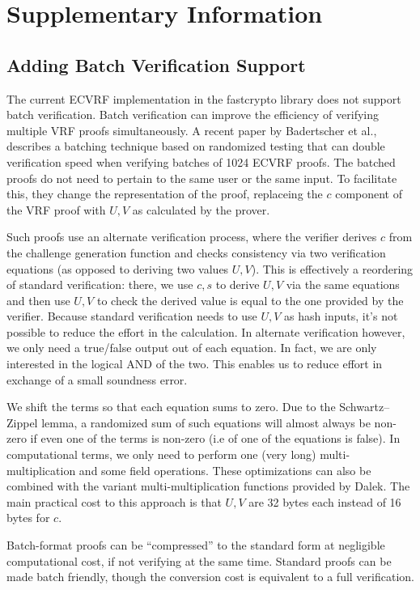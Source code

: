 \section{Supplementary Information}
\subsection{Adding Batch Verification Support}
The current ECVRF implementation in the fastcrypto library does not support batch verification. Batch verification can improve the efficiency of verifying multiple VRF proofs simultaneously. A recent paper by Badertscher et al.\cite{batch-ecvrf}, describes a batching technique based on randomized testing that can double verification speed when verifying batches of 1024 ECVRF proofs. The batched proofs do not need to pertain to the same user or the same input. To facilitate this, they change the representation of the proof, replaceing the $c$ component of the VRF proof with $U,V$ as calculated by the prover.


Such proofs use an alternate verification process, where the verifier derives $c$ from the challenge generation function and checks consistency via two verification equations (as opposed to deriving two values $U,V$). This is effectively a reordering of standard verification: there, we use $c,s$ to derive $U,V$ via the same equations and then use $U,V$ to check the derived value is equal to the one provided by the verifier. Because standard verification needs to use $U,V$ as hash inputs, it’s not possible to reduce the effort in the calculation. In alternate verification however, we only need a true/false output out of each equation. In fact, we are only interested in the logical AND of the two. This enables us to reduce effort in exchange of a small soundness error.   

We shift the terms so that each equation sums to zero. Due to the Schwartz–Zippel lemma, a randomized sum of such equations will almost always be non-zero if even one of the terms is non-zero (i.e of one of the equations is false). In computational terms, we only need to perform one (very long) multi-multiplication and some field operations. These optimizations can also be combined with the variant multi-multiplication functions provided by Dalek. The main practical cost to this approach is that $U,V$ are 32 bytes each instead of 16 bytes for $c$.

Batch-format proofs can be ``compressed'' to the standard form at negligible computational cost, if not verifying at the same time. Standard proofs can be made batch friendly, though the conversion cost is equivalent to a full verification.

